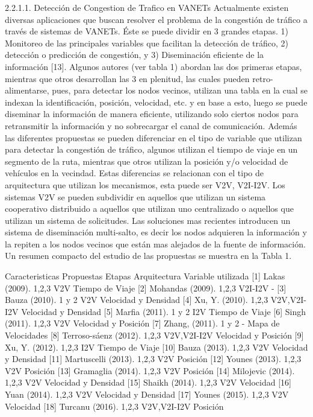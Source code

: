 2.2.1.1.	Detección de Congestion de Trafico en             VANETs
Actualmente existen diversas aplicaciones que buscan resolver el problema de la congestión de tráfico a través de sistemas de VANETs. Éste se puede dividir en 3 grandes etapas. 1) Monitoreo de las principales variables que facilitan la detección de tráfico, 2) detección o predicción de congestión, y 3) Diseminación eficiente de la información [13]. 
Algunos autores (ver tabla 1) abordan las dos primeras etapas, mientras que otros desarrollan las  3 en plenitud, las cuales pueden  retro-alimentarse, pues, para detectar los nodos vecinos, utilizan una tabla en la cual se indexan la identificación, posición,  velocidad, etc. y en base a esto,  luego se puede diseminar la información de manera eficiente, utilizando solo ciertos nodos para retransmitir la información y no sobrecargar el canal de comunicación.
Además las diferentes propuestas se pueden diferenciar en el tipo de variable que utilizan para detectar la congestión de tráfico, algunos utilizan el tiempo de viaje en un segmento de la ruta, mientras que otros utilizan la posición y/o velocidad de vehículos en la vecindad. Estas diferencias se relacionan  con el tipo de arquitectura que utilizan los mecanismos, esta puede ser V2V, V2I-I2V.
Los sistemas V2V se pueden subdividir en aquellos que utilizan un sistema cooperativo distribuido a aquellos que utilizan uno centralizado o aquellos que utilizan un sistema de solicitudes. Las soluciones mas recientes introducen un sistema de diseminación multi-salto, es decir los nodos adquieren la información y la repiten a los nodos vecinos que están mas alejados de la fuente de información. Un resumen compacto del estudio de las propuestas se muestra en la Tabla 1.

		Caracteristicas
	Propuestas	Etapas	Arquitectura	Variable utilizada
[1]	Lakas (2009). 	1,2,3	V2V	Tiempo de Viaje
[2]	Mohandas (2009). 	1,2,3	V2I-I2V	- 
[3]	Bauza (2010). 	1 y 2	V2V	Velocidad y Densidad
[4]	Xu, Y. (2010). 	1,2,3	V2V,V2I-I2V	Velocidad y Densidad
[5]	Marfia (2011). 	1 y 2	I2V	Tiempo de Viaje
[6]	Singh  (2011). 	1,2,3	V2V	Velocidad y Posición
[7]	Zhang, (2011). 	1 y 2	-	Mapa de Velocidades
[8]	Terroso-sáenz (2012). 	1,2,3	V2V,V2I-I2V	Velocidad y Posición
[9]	Xu, Y. (2012).	1,2,3	I2V	Tiempo de Viaje
[10]	Bauza  (2013). 	1,2,3	V2V	Velocidad y Densidad
[11]	Martuscelli  (2013).	1,2,3	V2V	Posición
[12]	Younes  (2013). 	1,2,3	V2V	Posición
[13]	Gramaglia (2014). 	1,2,3	V2V	Posición
[14]	Milojevic (2014). 	1,2,3	V2V	Velocidad y Densidad
[15]	Shaikh (2014). 	1,2,3	V2V	Velocidad
[16]	Yuan  (2014). 	1,2,3	V2V	Velocidad y Densidad
[17]	Younes (2015). 	1,2,3	V2V	Velocidad
[18]	Turcanu  (2016). 	1,2,3	V2V,V2I-I2V	Posición

